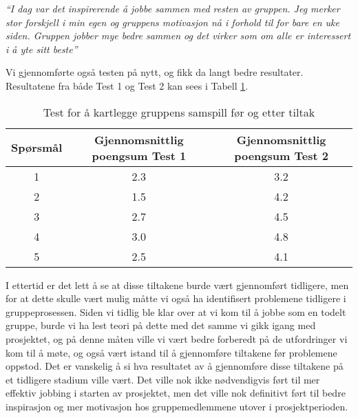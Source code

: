 \emph{``I dag var det inspirerende å jobbe sammen med resten av gruppen. Jeg merker stor forskjell i min egen og gruppens motivasjon nå i forhold til for bare en uke siden. Gruppen jobber mye bedre sammen og det virker som om alle er interessert i å yte sitt beste''}\newline

Vi gjennomførte også testen på nytt, og fikk da langt bedre resultater. Resultatene fra både Test 1 og Test 2 kan sees i Tabell \ref{Test}. \newline

\begin{table}[h]
\begin{center}
\begin{tabular}{| c | c | c | }
\hline
Spørsmål & Gjennomsnittlig poengsum Test 1 & Gjennomsnittlig poengsum Test 2 \\ \hline
1 & 2.3 & 3.2 \\ \hline
2 & 1.5 & 4.2 \\ \hline
3 & 2.7 & 4.5 \\ \hline
4 & 3.0 & 4.8 \\ \hline
5 & 2.5 & 4.1 \\ \hline
\end{tabular}
\caption{Test for å kartlegge gruppens samspill før og etter tiltak}
\label{Test}
\end{center}
\end{table}

I ettertid er det lett å se at disse tiltakene burde vært gjennomført tidligere, men for at dette skulle vært mulig måtte vi også ha identifisert problemene tidligere i gruppeprosessen. Siden vi tidlig ble klar over at vi kom til å jobbe som en todelt gruppe, burde vi ha lest teori på dette med det samme vi gikk igang med prosjektet, og på denne måten ville vi vært bedre forberedt på de utfordringer vi kom til å møte, og også vært istand til å gjennomføre tiltakene før problemene oppstod. Det er vanskelig å si hva resultatet av å gjennomføre disse tiltakene på et tidligere stadium ville vært. Det ville nok ikke nødvendigvis ført til mer effektiv jobbing i starten av prosjektet, men det ville nok definitivt ført til bedre inspirasjon og mer motivasjon hos gruppemedlemmene utover i prosjektperioden. 